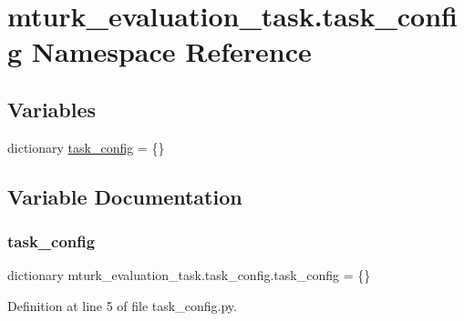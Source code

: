 \hypertarget{namespacemturk__evaluation__task_1_1task__config}{}\section{mturk\+\_\+evaluation\+\_\+task.\+task\+\_\+config Namespace Reference}
\label{namespacemturk__evaluation__task_1_1task__config}
\subsection*{Variables}
\begin{DoxyCompactItemize}
\item 
dictionary \hyperlink{namespacemturk__evaluation__task_1_1task__config_ab8a970308d96eed39e0998d07db622fc}{task\+\_\+config} = \{\}
\end{DoxyCompactItemize}


\subsection{Variable Documentation}
\mbox{\label{namespacemturk__evaluation__task_1_1task__config_ab8a970308d96eed39e0998d07db622fc}} 
\subsubsection{\texorpdfstring{task\+\_\+config}{task\_config}}
{\footnotesize\ttfamily dictionary mturk\+\_\+evaluation\+\_\+task.\+task\+\_\+config.\+task\+\_\+config = \{\}}



Definition at line 5 of file task\+\_\+config.\+py.

